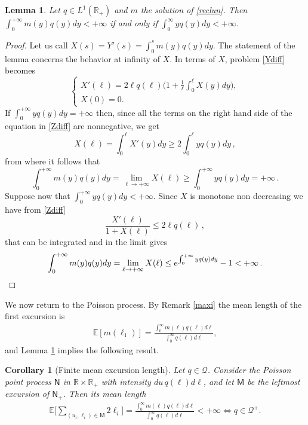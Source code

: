 \documentclass[12pt]{article}
\numberwithin{equation}{section}
\newtheorem{lemma}[theorem]{Lemma}
\newtheorem{corollary}[theorem]{Corollary}
\newcommand{\EE}{\mathbb E}
\newcommand{\RR}{\mathbb R}
\newcommand{\sM}{\mathsf{M}}
\newcommand{\sN}{\mathsf{N}}
\begin{document}
\begin{lemma}\label{lemma10}
	Let $q \in L^1(\RR_+)$ and $m$ the solution of \eqref{reclun}.
		Then $\int_0^{+\infty}m(y)q(y)dy<+\infty$ if and only if $\int_0^\infty yq(y)dy<+\infty$. 
\end{lemma}
\begin{proof}
Let us call $X(s)=Y'(s)=\int_0^s m(y) q(y)dy$. The statement of the lemma concerns the behavior at infinity of $X$. In terms of $X$, problem \eqref{Ydiff} becomes 
\begin{equation}\label{Zdiff}
	\left\{
	\begin{array}{l}
		X'(\ell)=2\ell q(\ell)\big(1 +\frac{1}{\ell}\int_0^\ell X(y)dy\big), \\
		X(0)=0.
	\end{array}
	\right.
\end{equation}
If $\int_0^{+\infty}yq(y)dy=+\infty$ then, since all the terms on the right hand side of the equation in \eqref{Zdiff} are nonnegative, we get
\[
X(\ell)=\int_0^\ell X'(y)dy\geq 2\int_0^\ell yq(y)dy\,,
\]
from where it follows that
\[
\int_0^{+\infty}m(y)q(y)dy=\lim_{\ell\to +\infty}X(\ell)\geq \int_0^{+\infty} yq(y)dy=+\infty\,.
\]
Suppose now that $\int_0^{+\infty}yq(y)dy<+\infty$. Since $X$ is monotone non decreasing  we have from \eqref{Zdiff}
\[
\frac{X'(\ell)}{1+X(\ell)}\leq 2\ell q(\ell)\,,
\]
that can be integrated and in the limit gives
\[
\int_0^{+\infty}m(y)q(y)dy=\lim_{\ell\to +\infty}X(\ell)\leq e^{\int_0^{+\infty} yq(y)dy}-1<+\infty\,.\qedhere
\]
\end{proof}

We now return to the Poisson process. By Remark \ref{maxi} the mean length of the first excursion is 
\begin{align}\label{3132}
\EE[m(\ell_1)] =\frac{\int_0^\infty m(\ell) q(\ell) d\ell}{\int_0^\infty q(\ell) d\ell},
\end{align}
and Lemma \ref{lemma10} implies the following result.
\begin{corollary}[Finite mean excursion length]\label{mlength}
Let $q\in \mathscr Q$. Consider the Poisson point process $\sN$ in $\RR\times \RR_+$ with intensity $du\, q(\ell)d\ell$, and let $\sM$ be the leftmost excursion of $\sN_+$. Then its mean length
\begin{align}\label{3133}
\EE\big[ \sum_{(u_i,\ell_i) \in \sM}2\ell_i\big]=\frac{\int_0^\infty m(\ell) q(\ell) d\ell}{\int_0^\infty q(\ell) d\ell}<+\infty \iff q\in \mathscr Q^+.
\end{align}
\end{corollary}
\end{document}
